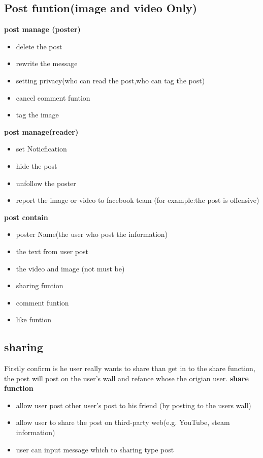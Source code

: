 \subsection{Post funtion(image and video Only)}

\textbf{post manage (poster)}
\begin{itemize}
\item delete the post
\item rewrite the message
\item setting privacy(who can read the post,who can tag the post)
\item cancel comment funtion
\item tag the image 
\end{itemize}

\textbf{post manage(reader)}
\begin{itemize}
\item set Noticfication
\item hide the post 
\item unfollow the poster
\item report the image or video to facebook team (for example:the post is
      offensive)
\end{itemize}

\textbf{post contain}
\begin{itemize}
\item poster Name(the user who post the information)
\item the text from user post
\item the video and image (not must be)
\item sharing funtion
\item comment funtion
\item like funtion
\end{itemize}


\subsection{sharing}
Firstly confirm is he user really wants to share than get in to the share
function, the post will post on the user's wall and refance whose the origian
user.
\textbf{share function}
\begin{itemize}
\item allow user post other user's post to his friend (by posting to the users
      wall)
\item allow user to share the post on third-party web(e.g. YouTube, steam
      information)
\item user can input message which to sharing type post 
\end{itemize}



